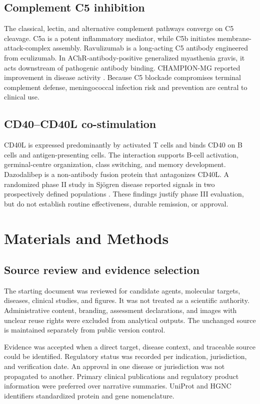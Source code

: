 \documentclass[12pt,a4paper]{article}
\begin{document}
\subsection{Complement C5 inhibition}
The classical, lectin, and alternative complement pathways converge on C5 cleavage. C5a is a potent inflammatory mediator, while C5b initiates membrane-attack-complex assembly. Ravulizumab is a long-acting C5 antibody engineered from eculizumab. In AChR-antibody-positive generalized myasthenia gravis, it acts downstream of pathogenic antibody binding. CHAMPION-MG reported improvement in disease activity \cite{vu2022}. Because C5 blockade compromises terminal complement defense, meningococcal infection risk and prevention are central to clinical use.

\subsection{CD40--CD40L co-stimulation}
CD40L is expressed predominantly by activated T cells and binds CD40 on B cells and antigen-presenting cells. The interaction supports B-cell activation, germinal-centre organization, class switching, and memory development. Dazodalibep is a non-antibody fusion protein that antagonizes CD40L. A randomized phase II study in Sjögren disease reported signals in two prospectively defined populations \cite{stclair2024}. These findings justify phase III evaluation, but do not establish routine effectiveness, durable remission, or approval.

\section{Materials and Methods}
\subsection{Source review and evidence selection}
The starting document was reviewed for candidate agents, molecular targets, diseases, clinical studies, and figures. It was not treated as a scientific authority. Administrative content, branding, assessment declarations, and images with unclear reuse rights were excluded from analytical outputs. The unchanged source is maintained separately from public version control.

Evidence was accepted when a direct target, disease context, and traceable source could be identified. Regulatory status was recorded per indication, jurisdiction, and verification date. An approval in one disease or jurisdiction was not propagated to another. Primary clinical publications and regulatory product information were preferred over narrative summaries. UniProt and HGNC identifiers standardized protein and gene nomenclature.
\end{document}
